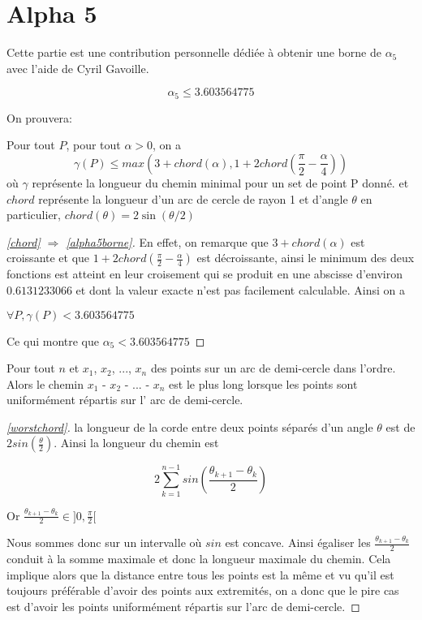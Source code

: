 \section{Alpha 5}

Cette partie est une contribution personnelle dédiée à obtenir une borne de $\alpha_5$ avec l'aide de Cyril Gavoille.

\begin{theorem}\label{alpha5borne}

$$\alpha_5 \leq 3.603564775$$

\end{theorem}

On prouvera:

\begin{lemma}\label{chord}
Pour tout $P$, pour tout $\alpha >0$, on a
$$\gamma(P) \leq max\left(3 + chord\left(\alpha\right), 1 + 2chord\left(\frac{\pi}{2} - \frac{\alpha}{4}\right)\right)$$
où $\gamma$ représente la longueur du chemin minimal pour un set de point P donné. et $chord$ représente la longueur d'un arc de cercle de rayon 1 et d'angle $\theta$ en particulier, $chord(\theta) = 2\sin(\theta/2)$
\end{lemma}

\begin{proof}[\ref{chord} $\Rightarrow$ \ref{alpha5borne}]

En effet, on remarque que $3+chord(\alpha)$ est croissante et que $1 + 2chord(\frac{\pi}{2} - \frac{\alpha}{4})$ est décroissante, ainsi le minimum des deux fonctions est atteint en leur croisement qui se produit en une abscisse d'environ $0.6131233066$ et dont la valeur exacte n'est pas facilement calculable. Ainsi on a

\(\forall P, \gamma(P) < 3.603564775\)

Ce qui montre que $\alpha_5 < 3.603564775$

\end{proof}

\begin{lemma}\label{worstchord}
Pour tout $n$ et $x_1$, $x_2$, ..., $x_n$ des points sur un arc de demi-cercle dans l'ordre. Alors le chemin $x_1$ - $x_2$ - ... - $x_n$ est le plus long lorsque les points sont uniformément répartis sur l' arc de demi-cercle.
\end{lemma}
\begin{proof}[\ref{worstchord}]
la longueur de la corde entre deux points séparés d'un angle $\theta$ est de $2sin\left(\frac{\theta}{2}\right)$. Ainsi la longueur du chemin est 

$$2\sum_{k=1}^{n-1} sin\left(\frac{\theta_{k+1} - \theta_k}{2}\right)$$

Or $\frac{\theta_{k+1} - \theta_k}{2} \in ]0, \frac{\pi}{2}[$

Nous sommes donc sur un intervalle où $sin$ est concave. Ainsi égaliser les $\frac{\theta_{k+1} - \theta_k}{2}$ conduit à la somme maximale et donc la longueur maximale du chemin. 
Cela implique alors que la distance entre tous les points est la même et vu qu'il est toujours préférable d'avoir des points aux extremités, on a donc que le pire cas est d'avoir les points uniformément répartis sur l'arc de demi-cercle.

\end{proof}

